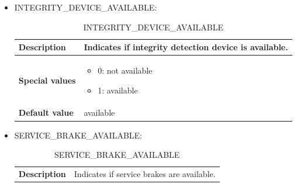 \begin{itemize}
\begin{longtable}{|l|l|}
				\hline

			\end{longtable}

		\item INTEGRITY\_DEVICE\_AVAILABLE:

			\begin{longtable}{|l|l|}
				\caption{INTEGRITY\_DEVICE\_AVAILABLE}\\
				\hline

					\begin{minipage}[t]{0.22\linewidth} \textbf{Description}	\end{minipage}
				&	\begin{minipage}[t]{0.78\linewidth} Indicates if integrity detection device is available. \end{minipage} \\

				\hline

					\begin{minipage}[t]{0.22\linewidth} \textbf{Special values}	\end{minipage}
				&	\begin{minipage}[t]{0.78\linewidth} \begin{itemize} \item 0: not available \item 1: available \end{itemize} \end{minipage} \\

				\hline

					\begin{minipage}[t]{0.22\linewidth} \textbf{Default value}	\end{minipage}
				&	\begin{minipage}[t]{0.78\linewidth} available \end{minipage} \\

				\hline

			\end{longtable}

		\item SERVICE\_BRAKE\_AVAILABLE:

			\begin{longtable}{|l|l|}
				\caption{SERVICE\_BRAKE\_AVAILABLE}\\
				\hline

					\begin{minipage}[t]{0.22\linewidth} \textbf{Description}	\end{minipage}
				&	\begin{minipage}[t]{0.78\linewidth} Indicates if service brakes are available. \end{minipage} \\


\end{longtable}
\end{itemize}

